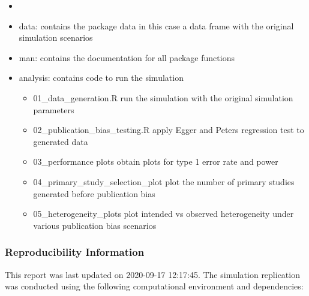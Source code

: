 \documentclass[
  english,
  doc,floatsintext,draftall]{apa6}
\providecommand{\tightlist}{%
  \setlength{\itemsep}{0pt}\setlength{\parskip}{0pt}}
\begin{document}
\begin{itemize}
\item
\item
  data: contains the package data in this case a data frame with the original simulation scenarios
\item
  man: contains the documentation for all package functions
\item
  analysis: contains code to run the simulation

  \begin{itemize}
  \tightlist
  \item
    01\_data\_generation.R
    run the simulation with the original simulation parameters
  \item
    02\_publication\_bias\_testing.R
    apply Egger and Peters regression test to generated data
  \item
    03\_performance plots obtain plots for type 1 error rate and power
  \item
    04\_primary\_study\_selection\_plot plot the number of primary studies generated before publication bias
  \item
    05\_heterogeneity\_plots plot intended vs observed heterogeneity under various publication bias scenarios
  \end{itemize}
\end{itemize}

\hypertarget{reproducibility-information}{%
\subsubsection{Reproducibility Information}\label{reproducibility-information}}

This report was last updated on 2020-09-17 12:17:45.
The simulation replication was conducted using the following computational environment and dependencies:
\FloatBarrier
\end{document}
